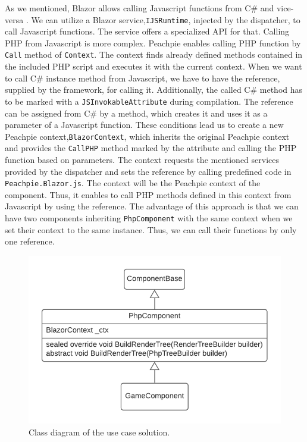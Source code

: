 As we mentioned, Blazor allows calling Javascript functions from C\#  and vice-versa .
We can utilize a Blazor service,\texttt{IJSRuntime}, injected by the dispatcher, to call Javascript functions.
The service offers a specialized API for that.
Calling PHP from Javascript is more complex.
Peachpie enables calling PHP function by \texttt{Call} method of \texttt{Context}. 
The context finds already defined methods contained in the included PHP script and executes it with the current context.
When we want to call C\# instance method from Javascript, we have to have the reference, supplied by the framework, for calling it.
Additionally, the called C\# method has to be marked with a \texttt{JSInvokableAttribute} during compilation.
The reference can be assigned from C\# by a method, which creates it and uses it as a parameter of a Javascript function.
These conditions lead us to create a new Peachpie context,\texttt{BlazorContext}, which inherits the original Peachpie context and provides the \texttt{CallPHP} method marked by the attribute and calling the PHP function based on parameters.
The context requests the mentioned services provided by the dispatcher and sets the reference by calling predefined code in \texttt{Peachpie.Blazor.js}.
The context will be the Peachpie context of the component.
Thus, it enables to call PHP methods defined in this context from Javascript by using the reference.
The advantage of this approach is that we can have two components inheriting \texttt{PhpComponent} with the same context when we set their context to the same instance.
Thus, we can call their functions by only one reference.
\par
\begin{figure}\centering
\includegraphics[scale=0.8]{./img/PhpComponentSolution}
\caption{Class diagram of the use case solution.}
\label{img17:solution}
\end{figure}
